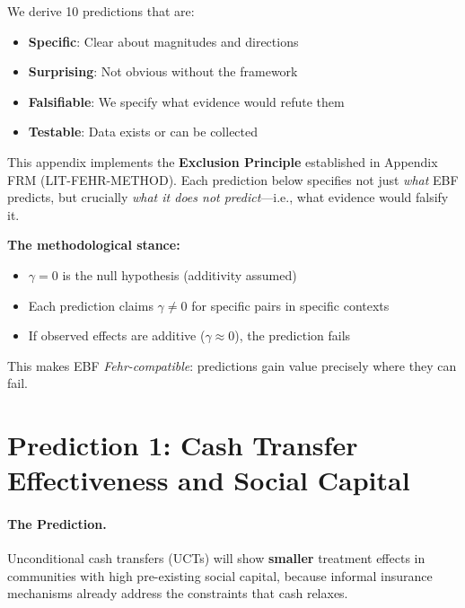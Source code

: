 We derive 10 predictions that are:
\begin{itemize}
    \item \textbf{Specific}: Clear about magnitudes and directions
    \item \textbf{Surprising}: Not obvious without the framework
    \item \textbf{Falsifiable}: We specify what evidence would refute them
    \item \textbf{Testable}: Data exists or can be collected
\end{itemize}

\begin{tcolorbox}[colback=blue!5!white, colframe=blue!75!black,
    title=\textbf{Connection to Appendix FRM: The Exclusion Principle}]
This appendix implements the \textbf{Exclusion Principle} established in Appendix FRM
(LIT-FEHR-METHOD). Each prediction below specifies not just \textit{what} EBF predicts,
but crucially \textit{what it does not predict}---i.e., what evidence would falsify it.

\textbf{The methodological stance:}
\begin{itemize}[noitemsep]
    \item $\gamma = 0$ is the null hypothesis (additivity assumed)
    \item Each prediction claims $\gamma \neq 0$ for specific pairs in specific contexts
    \item If observed effects are additive ($\gamma \approx 0$), the prediction fails
\end{itemize}

This makes EBF \textit{Fehr-compatible}: predictions gain value precisely where they can fail.
\end{tcolorbox}


\section{Prediction 1: Cash Transfer Effectiveness and Social Capital}
\label{sec:S-prediction1}

\paragraph{The Prediction.}
Unconditional cash transfers (UCTs) will show \textbf{smaller} treatment effects in communities with high pre-existing social capital, because informal insurance mechanisms already address the constraints that cash relaxes.

